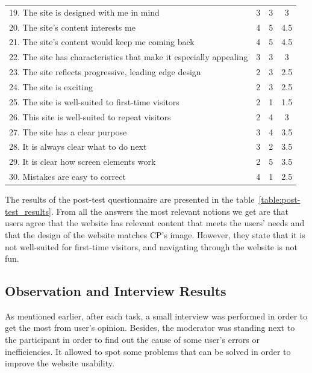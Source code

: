 \documentclass[a4paper]{article}
\begin{document}
\begin{table}[H]
\begin{center}
\begin{tabular}{p{30em}| c | c | c}
19. The site is designed with me in mind                       &  3  &  3 & 3  \\
\rowcolor{green!20}
20. The site’s content interests me                            &  4  &  5 & 4.5  \\
\rowcolor{green!20}
21. The site’s content would keep me coming back               &  4  &  5 & 4.5  \\
22. The site has characteristics that make it especially appealing  &  3  & 3 & 3   \\
23. The site reflects progressive, leading edge design         &  2  &  3 & 2.5  \\
24. The site is exciting                                       &  2  &  3 & 2.5  \\
\rowcolor{red!20}
25. The site is well-suited to first-time visitors             &  2  &  1 & 1.5  \\
26. This site is well-suited to repeat visitors                 &  2  &  4 & 3  \\
27. The site has a clear purpose                               &  3  &  4 & 3.5  \\
28. It is always clear what to do next                         &  3  &  2 & 3.5  \\
29. It is clear how screen elements work                       &  2  &  5 & 3.5  \\
30. Mistakes are easy to correct                               &  4  &  1 & 2.5  \\
\hline
\end{tabular}
\end{center}
\end{table}

The results of the post-test questionnaire are presented in the table~\ref{table:post-test_results}. From all the answers the most relevant notions we get are that users agree that the website has relevant content that meets the users' needs and that the design of the website matches CP's image. However, they state that it is not well-suited for first-time visitors, and navigating through the website is not fun.


\subsection{Observation and Interview Results}

As mentioned earlier, after each task, a small interview was performed in order to get the most from user's opinion.
Besides, the moderator was standing next to the participant in order to find out the cause of some user's errors or inefficiencies. 
It allowed to spot some problems that can be solved in order to improve the website usability.
\end{document}
